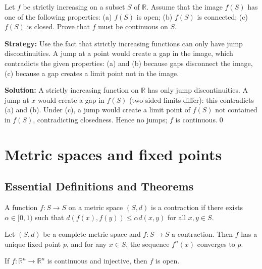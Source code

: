 \begin{problembox}
Let $f$ be strictly increasing on a subset $S$ of $\mathbb{R}$. Assume that the image $f(S)$ has one of the following properties: 
(a) $f(S)$ is open; (b) $f(S)$ is connected; (c) $f(S)$ is closed. Prove that $f$ must be continuous on $S$.
\end{problembox}

\noindent\textbf{Strategy:} Use the fact that strictly increasing functions can only have jump discontinuities. A jump at a point would create a gap in the image, which contradicts the given properties: (a) and (b) because gaps disconnect the image, (c) because a gap creates a limit point not in the image.

\bigskip\noindent\textbf{Solution:}
A strictly increasing function on $\mathbb{R}$ has only jump discontinuities. A jump at $x$ would create a gap in $f(S)$ (two-sided limits differ): this contradicts (a) and (b). Under (c), a jump would create a limit point of $f(S)$ not contained in $f(S)$, contradicting closedness. Hence no jumps; $f$ is continuous.\qed

\section{Metric spaces and fixed points}

\subsection*{Essential Definitions and Theorems}

\begin{definition}
A function $f: S \to S$ on a metric space $(S,d)$ is a contraction if there exists $\alpha \in [0,1)$ such that $d(f(x), f(y)) \leq \alpha d(x,y)$ for all $x,y \in S$.
\end{definition}

\begin{theorem}
Let $(S,d)$ be a complete metric space and $f: S \to S$ a contraction. Then $f$ has a unique fixed point $p$, and for any $x \in S$, the sequence $f^n(x)$ converges to $p$.
\end{theorem}

\begin{theorem}
If $f: \mathbb{R}^n \to \mathbb{R}^n$ is continuous and injective, then $f$ is open.
\end{theorem}




